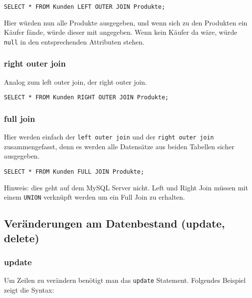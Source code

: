 
\begin{lstlisting}[caption={Left Join SQL}]
SELECT * FROM Kunden LEFT OUTER JOIN Produkte;
\end{lstlisting}

Hier würden nun alle Produkte ausgegeben, und wenn sich zu den Produkten ein Käufer fände, würde dieser mit angegeben. Wenn kein Käufer da wäre, würde \texttt{null} in den entsprechenden Attributen stehen.

\subsubsection{right outer join}
Analog zum left outer join, der right outer join.


\begin{lstlisting}[caption={Right Join SQL}]
SELECT * FROM Kunden RIGHT OUTER JOIN Produkte;
\end{lstlisting}

\subsubsection{full join}
Hier werden einfach der \texttt{left outer join} und der \texttt{right outer join} zusammengefasst, denn es werden alle Datensätze aus beiden Tabellen sicher ausgegeben.


\begin{lstlisting}[caption={Full Join SQL}]
SELECT * FROM Kunden FULL JOIN Produkte;
\end{lstlisting}

Hinweis: dies geht auf dem MySQL Server nicht. Left und Right Join müssen mit einem \texttt{UNION} verknüpft werden um ein Full Join zu erhalten.

\subsection{Veränderungen am Datenbestand (update, delete)}

\subsubsection{update}
Um Zeilen zu verändern benötigt man das \texttt{update} Statement. Folgendes Beispiel zeigt die Syntax:

